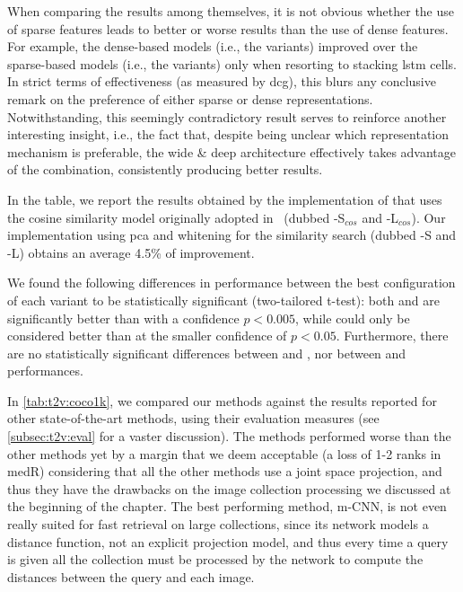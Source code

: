 When comparing the \ttv{} results among themselves, it is not obvious whether the use of sparse features leads to better or worse results than the use of dense features.
For example, the dense-based models (i.e.,  the \densettv{} variants) improved over the sparse-based models (i.e.,  the \sparsettv{} variants) only when resorting to stacking \gls{lstm} cells.
In strict terms of effectiveness (as measured by \gls{dcg}), this blurs any conclusive remark on the preference of either sparse or dense representations.
Notwithstanding, this seemingly contradictory result serves to reinforce another interesting insight, i.e.,  the fact that, despite being unclear which representation mechanism is preferable, the wide \& deep architecture effectively takes advantage of the combination, consistently producing better results.


In the table, we report the results obtained by the implementation of \wordvisual{} that uses the cosine similarity model originally adopted in~\cite{dong2018predicting} (dubbed \wordvisual{}-S$_{cos}$ and \wordvisual{}-L$_{cos}$).
Our implementation using \gls{pca} and whitening for the similarity search (dubbed \wordvisual{}-S and \wordvisual{}-L) obtains an average 4.5\% of improvement.

We found the following differences in performance between the best configuration of each variant to be statistically significant (two-tailored t-test): both \densettv{} and \widedeepttv{} are significantly better than \sparsettv{} with a confidence $p<0.005$, while \widedeepttv{} could only be considered better than \wordvisual{} at the smaller confidence of $p<0.05$.
Furthermore, there are no statistically significant differences between \widedeepttv{} and \densettv{}, nor between \densettv{} and \wordvisual{} performances.

In \ref{tab:t2v:coco1k}, we compared our methods against the results reported for other state-of-the-art methods, using their evaluation measures (see \ref{subsec:t2v:eval} for a vaster discussion).
The \ttv{} methods performed worse than the other methods yet by a margin that we deem acceptable (a loss of 1-2 ranks in \gls{medR}) considering that all the other methods use a joint space projection, and thus they have the drawbacks on the image collection processing we discussed at the beginning of the chapter. %
The best performing method, m-CNN, is not even really suited for fast retrieval on large collections, since its network models a distance function, not an explicit projection model, and thus every time a query is given all the collection must be processed by the network to compute the distances between the query and each image.

